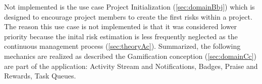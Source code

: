 Not implemented is the use case Project Initialization (\ref{sec:domainBbj}) which is designed to encourage project members to create the first risks within a project. The reason this use case is not implemented is that it was considered lower priority because the inital risk estimation is less frequently neglected as the continuous management process (\ref{sec:theoryAc}).
Summarized, the following mechanics are realized as described the Gamification conception (\ref{sec:domainCc}) are part of the application: Activity Stream and Notifications, Badges, Praise and Rewards, Task Queues.
